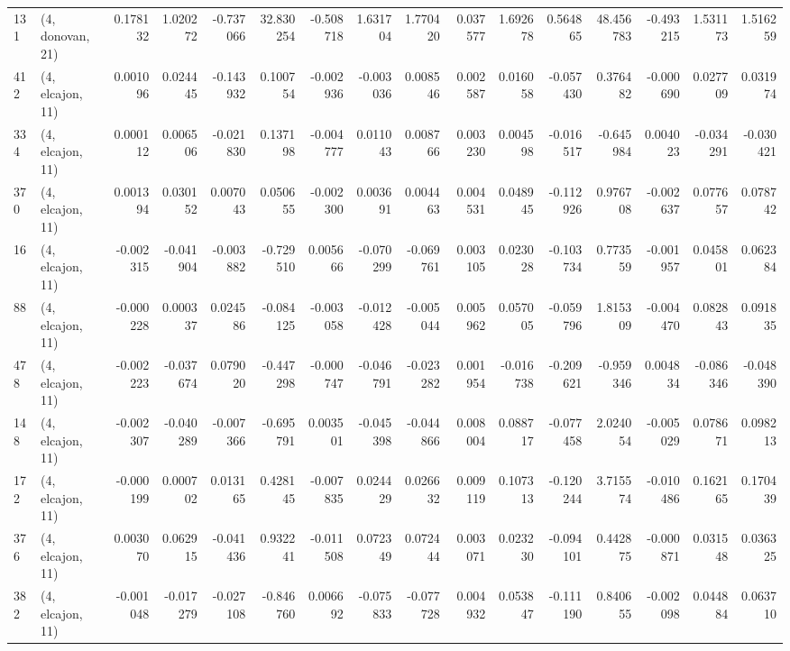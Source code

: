 \begin{tabular}{llrrrrrrrrrrrrrr}
131 &  (4, donovan, 21) &   0.178132 &  1.020272 & -0.737066 &   32.830254 & -0.508718 &   1.631704 &  1.770420 &  0.037577 &  1.692678 &  0.564865 &   48.456783 & -0.493215 &  1.531173 &  1.516259 \\
412 &  (4, elcajon, 11) &   0.001096 &  0.024445 & -0.143932 &    0.100754 & -0.002936 &  -0.003036 &  0.008546 &  0.002587 &  0.016058 & -0.057430 &    0.376482 & -0.000690 &  0.027709 &  0.031974 \\
334 &  (4, elcajon, 11) &   0.000112 &  0.006506 & -0.021830 &    0.137198 & -0.004777 &   0.011043 &  0.008766 &  0.003230 &  0.004598 & -0.016517 &   -0.645984 &  0.004023 & -0.034291 & -0.030421 \\
370 &  (4, elcajon, 11) &   0.001394 &  0.030152 &  0.007043 &    0.050655 & -0.002300 &   0.003691 &  0.004463 &  0.004531 &  0.048945 & -0.112926 &    0.976708 & -0.002637 &  0.077657 &  0.078742 \\
16  &  (4, elcajon, 11) &  -0.002315 & -0.041904 & -0.003882 &   -0.729510 &  0.005666 &  -0.070299 & -0.069761 &  0.003105 &  0.023028 & -0.103734 &    0.773559 & -0.001957 &  0.045801 &  0.062384 \\
88  &  (4, elcajon, 11) &  -0.000228 &  0.000337 &  0.024586 &   -0.084125 & -0.003058 &  -0.012428 & -0.005044 &  0.005962 &  0.057005 & -0.059796 &    1.815309 & -0.004470 &  0.082843 &  0.091835 \\
478 &  (4, elcajon, 11) &  -0.002223 & -0.037674 &  0.079020 &   -0.447298 & -0.000747 &  -0.046791 & -0.023282 &  0.001954 & -0.016738 & -0.209621 &   -0.959346 &  0.004834 & -0.086346 & -0.048390 \\
148 &  (4, elcajon, 11) &  -0.002307 & -0.040289 & -0.007366 &   -0.695791 &  0.003501 &  -0.045398 & -0.044866 &  0.008004 &  0.088717 & -0.077458 &    2.024054 & -0.005029 &  0.078671 &  0.098213 \\
172 &  (4, elcajon, 11) &  -0.000199 &  0.000702 &  0.013165 &    0.428145 & -0.007835 &   0.024429 &  0.026632 &  0.009119 &  0.107313 & -0.120244 &    3.715574 & -0.010486 &  0.162165 &  0.170439 \\
376 &  (4, elcajon, 11) &   0.003070 &  0.062915 & -0.041436 &    0.932241 & -0.011508 &   0.072349 &  0.072444 &  0.003071 &  0.023230 & -0.094101 &    0.442875 & -0.000871 &  0.031548 &  0.036325 \\
382 &  (4, elcajon, 11) &  -0.001048 & -0.017279 & -0.027108 &   -0.846760 &  0.006692 &  -0.075833 & -0.077728 &  0.004932 &  0.053847 & -0.111190 &    0.840655 & -0.002098 &  0.044884 &  0.063710 \\

\end{tabular}
